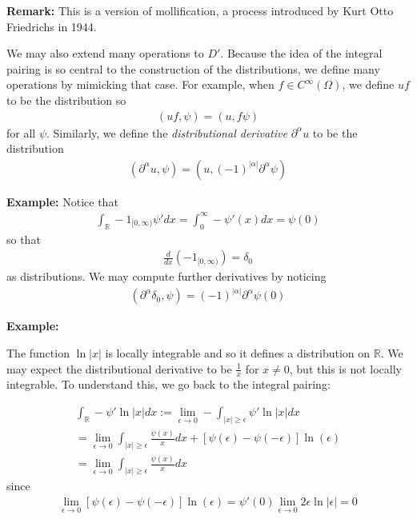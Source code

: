 \documentclass{article}
\newcommand{\R}{{\mathbb{R}}}
\newcommand{\pd}{\partial}
\begin{document}
	\textbf{Remark:} This is a version of mollification, a process introduced by Kurt Otto Friedrichs in 1944. 
	
	
	
	We may also extend many operations to $D'$. Because the idea of the integral pairing is so central to the construction of the distributions, we define many operations by mimicking that case. For example, when $f \in C^{\infty}(\Omega)$, we define $uf$ to be the distribution so 
	\begin{align*}
		(uf,\psi) = (u,f\psi)
	\end{align*}
	for all $\psi$. Similarly, we define the \textit{distributional derivative} $\pd^{\alpha} u$ to be the distribution 
	\begin{align*}
		(\pd^{\alpha}u,\psi) = (u, (-1)^{|\alpha|}\pd^{\alpha} \psi )
	\end{align*}
	
	\vspace{0.25 cm}
	\textbf{Example:}
	Notice that 
	\begin{align*}
		\int_{\R} -1_{[0,\infty)} \psi' dx = \int_{0}^{\infty} -\psi'(x) dx = \psi(0)
	\end{align*}
	so that 
	\begin{align*}
		\frac{d}{dx} (-1_{[0,\infty)}) = \delta_{0}
	\end{align*}
	as distributions. We may compute further derivatives by noticing 
	\begin{align*}
		(\pd^{\alpha} \delta_{0}, \psi) = (-1)^{|\alpha|} \pd^{\alpha} \psi ( 0)
	\end{align*}
	
	
	
	\vspace{0.25 cm}
	\textbf{Example:}
	
	The function $\ln|x|$ is locally integrable and so it defines a distribution on $\R$. We may expect the distributional derivative to be $\frac{1}{x}$ for $x \neq 0$, but this is not locally integrable. To understand this, we go back to the integral pairing:
	
	\begin{align*}
		\int_{\R} - \psi' \ln|x|dx := \lim_{\epsilon \to 0} -\int_{|x| \geq \epsilon} \psi' \ln|x| dx \\
		= \lim_{\epsilon \to 0} \int_{|x| \geq \epsilon} \frac{\psi(x)}{x} dx + [\psi(\epsilon) - \psi(-\epsilon)]\ln(\epsilon) \\
		 = \lim_{\epsilon \to 0} \int_{|x| \geq \epsilon} \frac{\psi(x)}{x} dx 
	\end{align*}
	since 
	\begin{align*}
		\lim_{\epsilon \to 0 } [\psi(\epsilon) - \psi(-\epsilon)]\ln(\epsilon) = \psi'(0) \lim_{\epsilon \to 0} 2\epsilon \ln|\epsilon| = 0
	\end{align*}
	
\end{document}
